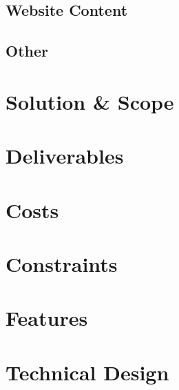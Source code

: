 \documentclass[runningheads]{llncs}
\begin{document}
\subsection{Website Content}


\subsection{Other}
































\section{Solution \& Scope}


\section{Deliverables}
\section{Costs}
\section{Constraints}
\section{Features}
\section{Technical Design}


\end{document}

